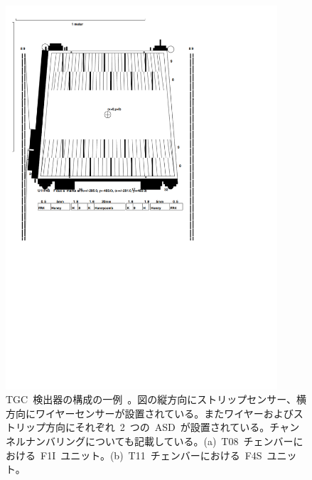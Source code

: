 \begin{figure}[H]
\begin{minipage}{0.49\hsize}
        \includegraphics[width=0.9\textwidth]{img/pdf/u11f4s.pdf}
        \subcaption{}
        \end{minipage}
        \caption[TGC~検出器の構成の一例]{TGC~検出器の構成の一例~\cite{URL:04}。図の縦方向にストリップセンサー、横方向にワイヤーセンサーが設置されている。またワイヤーおよびストリップ方向にそれぞれ~2~つの~ASD~が設置されている。チャンネルナンバリングについても記載している。(a)~T08~チェンバーにおける~F1I~ユニット。(b)~T11~チェンバーにおける~F4S~ユニット。}
        \label{fig:tgcT}
\end{figure}

